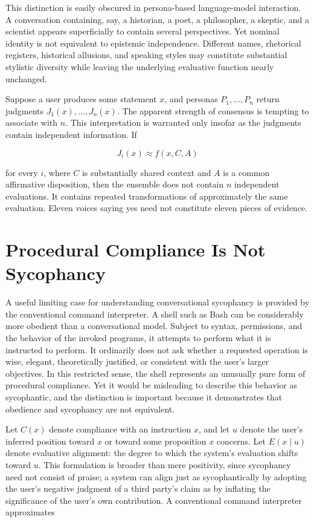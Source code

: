 \documentclass[11pt]{article}
\begin{document}
This distinction is easily obscured in persona-based language-model interaction. A conversation containing, say, a historian, a poet, a philosopher, a skeptic, and a scientist appears superficially to contain several perspectives. Yet nominal identity is not equivalent to epistemic independence. Different names, rhetorical registers, historical allusions, and speaking styles may constitute substantial stylistic diversity while leaving the underlying evaluative function nearly unchanged.

Suppose a user produces some statement $x$, and personas $P_1,\ldots,P_n$ return judgments $J_1(x),\ldots,J_n(x)$. The apparent strength of consensus is tempting to associate with $n$. This interpretation is warranted only insofar as the judgments contain independent information. If

\[
J_i(x) \approx f(x,C,A)
\]

for every $i$, where $C$ is substantially shared context and $A$ is a common affirmative disposition, then the ensemble does not contain $n$ independent evaluations. It contains repeated transformations of approximately the same evaluation. Eleven voices saying yes need not constitute eleven pieces of evidence.

\section{Procedural Compliance Is Not Sycophancy}

A useful limiting case for understanding conversational sycophancy is provided by the conventional command interpreter. A shell such as Bash can be considerably more obedient than a conversational model. Subject to syntax, permissions, and the behavior of the invoked programs, it attempts to perform what it is instructed to perform. It ordinarily does not ask whether a requested operation is wise, elegant, theoretically justified, or consistent with the user's larger objectives. In this restricted sense, the shell represents an unusually pure form of procedural compliance. Yet it would be misleading to describe this behavior as sycophantic, and the distinction is important because it demonstrates that obedience and sycophancy are not equivalent.

Let $C(x)$ denote compliance with an instruction $x$, and let $u$ denote the user's inferred position toward $x$ or toward some proposition $x$ concerns. Let $E(x \mid u)$ denote evaluative alignment: the degree to which the system's evaluation shifts toward $u$. This formulation is broader than mere positivity, since sycophancy need not consist of praise; a system can align just as sycophantically by adopting the user's negative judgment of a third party's claim as by inflating the significance of the user's own contribution. A conventional command interpreter approximates
\end{document}
